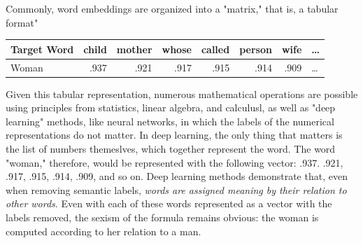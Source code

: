 \documentclass[11pt]{article}
\begin{document}
Commonly, word embeddings are organized into a "matrix," that is, a
tabular format"

\begin{center}
\begin{tabular}{lrrrrrrl}
Target Word & child & mother & whose & called & person & wife & \ldots{}\\
\hline
Woman & .937 & .921 & .917 & .915 & .914 & .909 & \ldots{}\\
\end{tabular}
\end{center}


Given this tabular representation, numerous mathematical operations
are possible using principles from statistics, linear algebra, and
calculusl, as well as "deep learning" methods, like neural networks,
in which the labels of the numerical representations do not matter. In
deep learning, the only thing that matters is the list of numbers
themeslves, which together represent the word. The word "woman,"
therefore, would be represented with the following vector: .937. .921,
.917, .915, .914, .909, and so on. Deep learning methods demonstrate
that, even when removing semantic labels, \emph{words are assigned meaning
by their relation to other words}. Even with each of these words
represented as a vector with the labels removed, the sexism of the
formula remains obvious: the woman is computed according to her
relation to a man.
\end{document}
